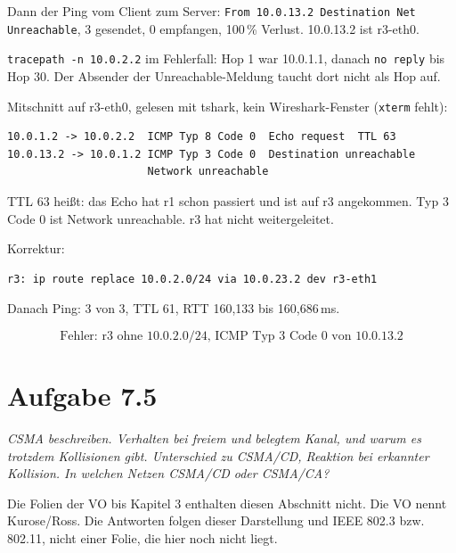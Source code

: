 \documentclass[a4paper,11pt]{article}
\newif\ifexplain
\newcommand{\aufgabe}[1]{\section*{Aufgabe #1}}
\newcommand{\angabe}[1]{{\raggedright\textit{#1}\par}\smallskip}
\newcommand{\explain}[1]{\ifexplain\begin{erklbox}#1\end{erklbox}\fi}
\begin{document}
Dann der Ping vom Client zum Server: \texttt{From 10.0.13.2 Destination Net Unreachable}, 3 gesendet, 0 empfangen, 100\,\% Verlust. 10.0.13.2 ist r3-eth0.

\explain{\texttt{ip addr} sagt, ob das Interface existiert und eine Adresse hat. \texttt{ip route} sagt, ob der Router das Zielnetz kennt. Ping zum Nachbarn trennt ``Link tot'' von ``Route fehlt''. Ping zum Server nennt den Absender der Fehlermeldung. Hier ist das 10.0.13.2, also r3, nicht der Client und nicht der Server.}

\texttt{tracepath -n 10.0.2.2} im Fehlerfall: Hop 1 war 10.0.1.1, danach \texttt{no reply} bis Hop 30. Der Absender der Unreachable-Meldung taucht dort nicht als Hop auf.

Mitschnitt auf r3-eth0, gelesen mit tshark, kein Wireshark-Fenster (\texttt{xterm} fehlt):
\begin{lstlisting}
10.0.1.2 -> 10.0.2.2  ICMP Typ 8 Code 0  Echo request  TTL 63
10.0.13.2 -> 10.0.1.2 ICMP Typ 3 Code 0  Destination unreachable
                      Network unreachable
\end{lstlisting}
TTL 63 heißt: das Echo hat r1 schon passiert und ist auf r3 angekommen. Typ 3 Code 0 ist Network unreachable. r3 hat nicht weitergeleitet.

\explain{Wireshark wird entscheidend, wenn ping nur ``timeout'' sagt oder tracepath keinen Absender nennt. Hier hat ping den Absender schon genannt. Der Mitschnitt bestätigt ihn am Interface r3-eth0 und zeigt, dass das Paket ankam und nicht irgendwo davor verloren ging. \texttt{ip addr} kann diesen Unterschied nicht zeigen.}

Korrektur:
\begin{lstlisting}
r3: ip route replace 10.0.2.0/24 via 10.0.23.2 dev r3-eth1
\end{lstlisting}
Danach Ping: 3 von 3, TTL 61, RTT 160,133 bis 160,686\,ms.

\[
\boxed{\text{Fehler: r3 ohne 10.0.2.0/24, ICMP Typ 3 Code 0 von 10.0.13.2}}
\]

\aufgabe{7.5}
\angabe{CSMA beschreiben. Verhalten bei freiem und belegtem Kanal, und warum es trotzdem Kollisionen gibt. Unterschied zu CSMA/CD, Reaktion bei erkannter Kollision. In welchen Netzen CSMA/CD oder CSMA/CA?}

Die Folien der VO bis Kapitel 3 enthalten diesen Abschnitt nicht. Die VO nennt Kurose/Ross. Die Antworten folgen dieser Darstellung und IEEE 802.3 bzw. 802.11, nicht einer Folie, die hier noch nicht liegt.
\end{document}
